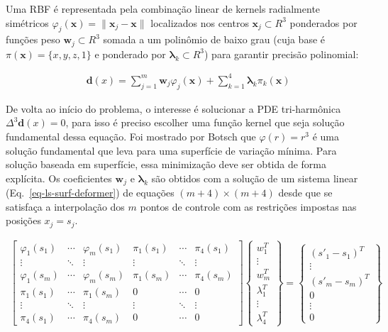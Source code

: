 Uma RBF é representada pela combinação linear de kernels radialmente simétricos $\varphi_j(\boldsymbol{x})=\lVert\boldsymbol{x}_j-\boldsymbol{x}\rVert$ localizados nos centros $\boldsymbol{x}_j\subset R^3$ ponderados por funções peso $\boldsymbol{w}_j\subset R^3$ somada a um polinômio de baixo grau (cuja base é $\pi(\boldsymbol{x})=\{x,y,z,1\}$ e ponderado por $\boldsymbol{\lambda}_k\subset R^3$) para garantir precisão polinomial:

\begin{align}
  &\boldsymbol{d}(x)=\sum_{j=1}^m \boldsymbol{w}_j\varphi_j(\boldsymbol{x})+\sum_{k=1}^4 \boldsymbol{\lambda}_k\pi_k(\boldsymbol{x})\label{eq-surf-rbf}
\end{align}

De volta ao início do problema, o interesse é solucionar a PDE tri-harmônica $\Delta^3\boldsymbol{d}(x)=0$, para isso é preciso escolher uma função kernel que seja solução fundamental dessa equação. Foi mostrado por Botsch\cite{Botsch} que $\varphi(r)=r^3$ é uma solução fundamental que leva para uma superfície de variação mínima. Para solução baseada em superfície, essa minimização deve ser obtida de forma explícita. Os coeficientes $\boldsymbol{w}_j$ e $\boldsymbol{\lambda}_k$ são obtidos com a solução de um sistema linear (Eq.~\ref{eq-ls-surf-deformer}) de equações $(m+4)\times(m+4)$ desde que se satisfaça a interpolação dos $m$ pontos de controle com as restrições impostas nas posições $x_j=s_j$.\cite{Muller}

\begin{align}
  \begin{bmatrix}
    \varphi_1(s_1) & \cdots & \varphi_m(s_1) & \pi_1(s_1) & \cdots & \pi_4(s_1)\\ 
    \vdots & \ddots & \vdots & \vdots & \ddots & \vdots\\
    \varphi_1(s_m) & \cdots & \varphi_m(s_m) & \pi_1(s_m) & \cdots & \pi_4(s_m)\\ 
    \pi_1(s_1) & \cdots & \pi_1(s_m) & 0 & \cdots & 0\\
    \vdots & \ddots & \vdots & \vdots & \ddots & \vdots\\
    \pi_4(s_1) & \cdots & \pi_4(s_m) & 0 & \cdots & 0
  \end{bmatrix}
  \begin{Bmatrix}
    w_1^T\\
    \vdots\\
    w_m^T\\
    \lambda_1^T\\
    \vdots\\
    \lambda_4^T
  \end{Bmatrix}=
  \begin{Bmatrix}
    (s'_1-s_1)^T\\
    \vdots\\
    (s'_m-s_m)^T\\
    0\\
    \vdots\\
    0
  \end{Bmatrix}\label{eq-ls-surf-deformer}
\end{align}

